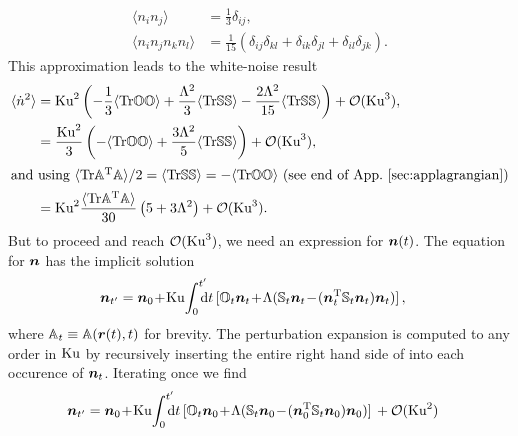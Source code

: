 \documentclass[thesis.tex]{subfiles}
\begin{document}
\begin{align*}
	\langle n_i n_j \rangle &= \frac{1}{3}\delta_{ij}, \\
	\langle n_i n_j n_k n_l \rangle &= \frac{1}{15}(\delta_{ij}\delta_{kl} + \delta_{ik}\delta_{jl} + \delta_{il}\delta_{jk}).
\end{align*}
This approximation leads to the white-noise result
\begin{align*}
	\langle \dot n^2\rangle &= 
	\ku^2 \left(-\frac{1}{3}\langle\tr\ma O\ma O\rangle +  \frac{\Lambda^2}{3}\langle\tr\ma S \ma S\rangle - \frac{2\Lambda^2}{15}\langle\tr\ma S\ma S \rangle\right) + \mathcal O(\ku^3),  \\
	&= \frac{\ku^2}{3}\left(-\langle\tr\ma O\ma O\rangle +  \frac{3\Lambda^2}{5}\langle\tr\ma S \ma S\rangle\right) + \mathcal O(\ku^3),  \\
	\intertext{and using $\langle\tr\ma A\transpose \ma A\rangle/2=\langle\tr\ma S\ma S\rangle=-\langle\tr\ma O\ma O\rangle$ (see end of App.~\secref{applagrangian})}
	&= \ku^2\frac{\langle\tr\ma A\transpose \ma A\rangle}{30}\left(5 + 3 \Lambda^2\right)+ \mathcal O(\ku^3).  
\end{align*}
But to proceed and reach $\mathcal O(\mbox{Ku}^3)$, we need an expression for $\mbox{\boldmath$n$}(t)$.
The equation for $\mbox{\boldmath$n$}$ has the implicit solution
\begin{align*}
\ve n_{t'}&=\ve n_0\!+\!\ku\!\int_0^{t'}\!\!\!\!{\rm d}t\,[\ma O_{t}\ve n_{t}\!%
+\!\Lambda(\ma S_{t}\ve n_{t}\!-\!(\ve n_{t}\transpose\ma S_{t}\ve n_{t})\ve n_{t})]\,,
\end{align*}
where $\mathbb{A}_t \equiv \mathbb{A}(\mbox{\boldmath$r$}(t), t)$ for brevity.
The perturbation expansion is computed  to any order in $\mbox{Ku}$ by recursively inserting the entire right hand side of  into each occurence of $\mbox{\boldmath$n$}_t$.
Iterating once we find
\begin{align}
\ve n_{t'}&=\ve n_0\!+\!\ku\!\int_0^{t'}\!\!\!\!{\rm d}t\,[\ma O_{t}\ve n_{0}\! +\!\Lambda(\ma S_{t}\ve n_{0}\!-\!(\ve n_{0}\transpose\ma S_{t}\ve n_{0})\ve n_{0})]\, + \mathcal O(\ku^2)
\eqnlab{n_expansion}
\end{align}
\end{document}
